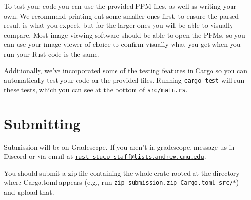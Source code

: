 \documentclass{article}
\begin{document}
To test your code you can use the provided PPM files, as well as writing your own. We recommend printing out some smaller ones first, to ensure the parsed result is what you expect, but for the larger ones you will be able to visually compare. Most image viewing software should be able to open the PPMs, so you can use your image viewer of choice to confirm visually what you get when you run your Rust code is the same.

Additionally, we've incorporated some of the testing features in Cargo so you can automatically test your code on the provided files. Running \texttt{cargo test} will run these tests, which you can see at the bottom of \texttt{src/main.rs}.

\section*{Submitting}

Submission will be on Gradescope. If you aren't in gradescope, message us in Discord or via email at \href{mailto:rust-stuco-staff@lists.andrew.cmu.edu}{\texttt{rust-stuco-staff@lists.andrew.cmu.edu}}.

You should submit a zip file containing the whole crate rooted at the directory where Cargo.toml appears (e.g., run \texttt{zip submission.zip Cargo.toml src/*}) and upload that.
\end{document}
